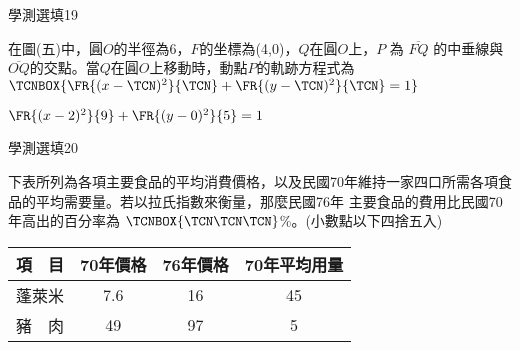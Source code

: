\begin{QUESTIONS}
\begin{QUESTION}
    \end{QUESTION}
    \begin{QUESTION}
        \begin{ExamInfo}{87}{學測}{選填}{19}
        \end{ExamInfo}
        \begin{ExamAnsRateInfo}{}{}{}{}
        \end{ExamAnsRateInfo}
        \begin{QBODY}
            在圖(五)中，圓$O$的半徑為6，$F$的坐標為(4,0)，$Q$在圓$O$上，$P$ 為 $\overline{FQ}$ 的中垂線與$\overline{OQ}$的交點。當$Q$在圓$O$上移動時，動點$P$的軌跡方程式為
            $\TCNBOX{\FR{(x-\TCN)^2}{\TCN} +\FR{(y-\TCN)^2}{\TCN} = 1 }$
        \end{QBODY}
        \begin{QFROMS}
        \end{QFROMS}
        \begin{QTAGS}\end{QTAGS}
        \begin{QANS}
            $\FR{(x-2)^2}{9} + \FR{(y-0)^2}{5} =1 $
        \end{QANS}
        \begin{QSOLLIST}
        \end{QSOLLIST}
        \begin{QEMPTYSPACE}
        \end{QEMPTYSPACE}
    \end{QUESTION}
    \begin{QUESTION}
        \begin{ExamInfo}{87}{學測}{選填}{20}
        \end{ExamInfo}
        \begin{ExamAnsRateInfo}{}{}{}{}
        \end{ExamAnsRateInfo}
        \begin{QBODY}
            下表所列為各項主要食品的平均消費價格，以及民國70年維持一家四口所需各項食品的平均需要量。若以拉氏指數來衡量，那麼民國76年
            主要食品的費用比民國70年高出的百分率為 $\TCNBOX{\TCN\TCN\TCN}$\%。(小數點以下四捨五入)\\
        \begin{tabular}{|c|c|c|c|}
        	\hline
        	項　目  & 70年價格 & 76年價格 & 70年平均用量 \\ \hline
        	蓬萊米  &  7.6  &  16   &   45    \\
        	豬　肉  &  49   &  97   &    5    \\ 

\end{tabular}
\end{QBODY}
\end{QUESTION}
\end{QUESTIONS}
